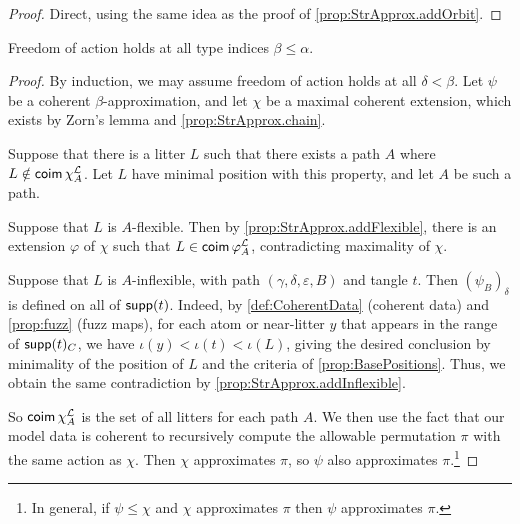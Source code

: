 \begin{proof}
  Direct, using the same idea as the proof of \cref{prop:StrApprox.addOrbit}.
\end{proof}
\begin{theorem}
  \label{thm:freedom_of_action}
  Freedom of action holds at all type indices \( \beta \leq \alpha \).
\end{theorem}
\begin{proof}
  By induction, we may assume freedom of action holds at all \( \delta < \beta \).
  Let \( \psi \) be a coherent \( \beta \)-approximation, and let \( \chi \) be a maximal coherent extension, which exists by Zorn's lemma and \cref{prop:StrApprox.chain}.

  Suppose that there is a litter \( L \) such that there exists a path \( A \) where \( L \notin \operatorname{\mathsf{coim}} \chi_A^{\mathcal L} \).
  Let \( L \) have minimal position with this property, and let \( A \) be such a path.

  Suppose that \( L \) is \( A \)-flexible.
  Then by \cref{prop:StrApprox.addFlexible}, there is an extension \( \varphi \) of \( \chi \) such that \( L \in \operatorname{\mathsf{coim}} \varphi_A^{\mathcal L} \), contradicting maximality of \( \chi \).

  Suppose that \( L \) is \( A \)-inflexible, with path \( (\gamma,\delta,\varepsilon,B) \) and tangle \( t \).
  Then \( (\psi_B)_\delta \) is defined on all of \( \operatorname{\mathsf{supp}}(t) \).
  Indeed, by \cref{def:CoherentData} (coherent data) and \cref{prop:fuzz} (fuzz maps), for each atom or near-litter \( y \) that appears in the range of \( \operatorname{\mathsf{supp}}(t)_C \), we have \( \iota(y) < \iota(t) < \iota(L) \), giving the desired conclusion by minimality of the position of \( L \) and the criteria of \cref{prop:BasePositions}.
  Thus, we obtain the same contradiction by \cref{prop:StrApprox.addInflexible}.

  So \( \operatorname{\mathsf{coim}} \chi_A^{\mathcal L} \) is the set of all litters for each path \( A \).
  We then use the fact that our model data is coherent to recursively compute the allowable permutation \( \pi \) with the same action as \( \chi \).
  Then \( \chi \) approximates \( \pi \), so \( \psi \) also approximates \( \pi \).\footnote{In general, if \( \psi \leq \chi \) and \( \chi \) approximates \( \pi \) then \( \psi \) approximates \( \pi \).}
\end{proof}
